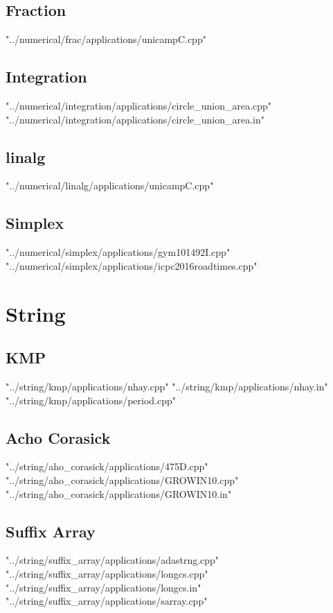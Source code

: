 \documentclass [12pt,onecolumn,oneside]{article}
\begin{document}
\subsection{ Fraction}
 {"../numerical/frac/applications/unicampC.cpp"}
\subsection{ Integration}
 {"../numerical/integration/applications/circle_union_area.cpp"}
 {"../numerical/integration/applications/circle_union_area.in"}
\subsection{ linalg}
 {"../numerical/linalg/applications/unicampC.cpp"}
\subsection{ Simplex}
 {"../numerical/simplex/applications/gym101492I.cpp"}
 {"../numerical/simplex/applications/icpc2016roadtimes.cpp"}
\newpage

\section{String}
\subsection{ KMP}
 {"../string/kmp/applications/nhay.cpp"}
 {"../string/kmp/applications/nhay.in"}
 {"../string/kmp/applications/period.cpp"}
\subsection{ Acho Corasick}
 {"../string/aho_corasick/applications/475D.cpp"}
 {"../string/aho_corasick/applications/GROWIN10.cpp"}
 {"../string/aho_corasick/applications/GROWIN10.in"}
\subsection{ Suffix Array}
 {"../string/suffix_array/applications/adastrng.cpp"}
 {"../string/suffix_array/applications/longcs.cpp"}
 {"../string/suffix_array/applications/longcs.in"}
 {"../string/suffix_array/applications/sarray.cpp"}
\newpage
\end{document}
